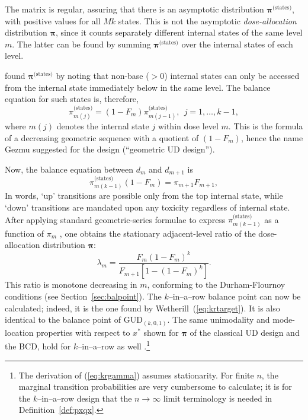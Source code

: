 The matrix is regular, assuring that there is an asymptotic distribution $\boldsymbol{\pi}^{\textrm{(states)}}$, with positive values for all $Mk$ states. This is not the asymptotic \emph{dose-allocation} distribution $\boldsymbol{\pi}$, since it counts separately different internal states of the same level $m$. The latter can be found by summing $\boldsymbol{\pi}^{\textrm{(states)}}$ over the internal states of each level.

\cite{Gezm:Geom:1996} found  $\boldsymbol{\pi}^{\textrm{(states)}}$ by noting that non-base ($>0$) internal states can only be accessed from the internal state immediately below in the same level. The balance equation for such states is, therefore,
%
\begin{equation}\label{eq:kinternal}
\pi^{\textrm{(states)}}_{m(j)}=\left(1-F_m\right)\pi^{\textrm{(states)}}_{m(j-1)},\ \ j=1,\ldots,k-1,
\end{equation}
\noindent where $m(j)$ denotes the internal state $j$ within dose level $m$. This is the formula of a decreasing geometric sequence with a quotient of $\left(1-F_m\right)$, hence the name Gezmu suggested for the design (``geometric UD design'').

Now, the balance equation between $d_m$ and $d_{m+1}$ is
%
\begin{equation}\label{eq:kexternal}
\pi^{\textrm{(states)}}_{m(k-1)}\left(1-F_m\right)=\pi_{m+1}F_{m+1},
\end{equation}
%
\noindent In words, `up' transitions are possible only from the top internal state, while `down' transitions are mandated upon any toxicity regardless of internal state. After applying standard geometric-series formulae to express $\pi^{\textrm{(states)}}_{m(k-1)}$ as a function of $\pi_m$ , one obtains the stationary adjacent-level ratio of the dose-allocation distribution $\boldsymbol{\pi}$:
%
\begin{equation}\label{eq:krgamma}
\lambda_m=\frac{F_m\left(1-F_m\right)^{k}}{F_{m+1}\left[1-\left(1-F_m\right)^{k}\right]}.
\end{equation}
%
This ratio is monotone decreasing in $m$, conforming to the Durham-Flournoy conditions
(see Section~\ref{sec:balpoint}). The $k$--in--a--row balance point can now be calculated; indeed, it is the one found by Wetherill~(\ref{eq:krtarget}). It is also identical to the balance point of GUD$_{(k,0,1)}$. The same unimodality and mode-location properties with respect to $x^*$ shown for $\boldsymbol{\pi}$ of the classical UD design and the BCD, hold for $k$--in--a--row as well \citep{Oron:Hoff:thek:2009}.\footnote{The derivation of (\ref{eq:krgamma}) assumes stationarity. For finite $n$, the marginal transition probabilities are very cumbersome to calculate; it is for the $k$--in--a--row design that the $n\to\infty$ limit terminology is needed in Definition~\ref{def:pxqx}.}

